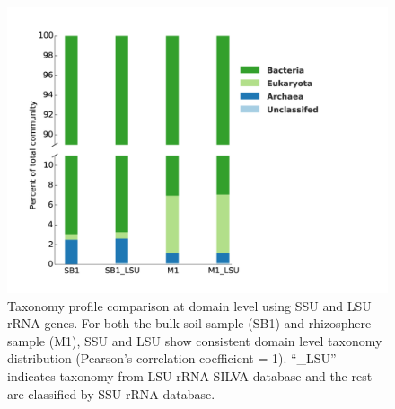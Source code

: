 \documentclass[]{msu-thesis}
\begin{document}
\begin{figure}[tbph!]
  \centering
  \includegraphics[width=1\textwidth]{figs/chap2_figS7}
  \caption[Taxonomy profile comparison at domain level using SSU and LSU rRNA genes]{Taxonomy profile comparison at domain level using SSU and LSU rRNA genes. For both the bulk soil sample (SB1) and rhizosphere sample (M1), SSU and LSU show consistent domain level taxonomy distribution (Pearson’s correlation coefficient = 1). ``\_LSU'' indicates taxonomy from LSU rRNA SILVA database and the rest are classified by SSU rRNA database.}
  \label{fig:chap2FigS7}
\end{figure}
\end{document}
